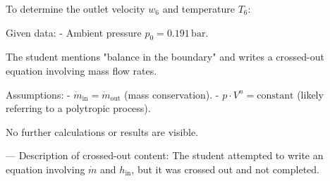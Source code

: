 To determine the outlet velocity \( w_6 \) and temperature \( T_6 \):  

Given data:  
- Ambient pressure \( p_0 = 0.191 \, \text{bar} \).  

The student mentions "balance in the boundary" and writes a crossed-out equation involving mass flow rates.  

Assumptions:  
- \( \dot{m}_{\text{in}} = \dot{m}_{\text{out}} \) (mass conservation).  
- \( p \cdot V^n = \text{constant} \) (likely referring to a polytropic process).  

No further calculations or results are visible.  

---  
Description of crossed-out content:  
The student attempted to write an equation involving \( \dot{m} \) and \( h_{\text{in}} \), but it was crossed out and not completed.